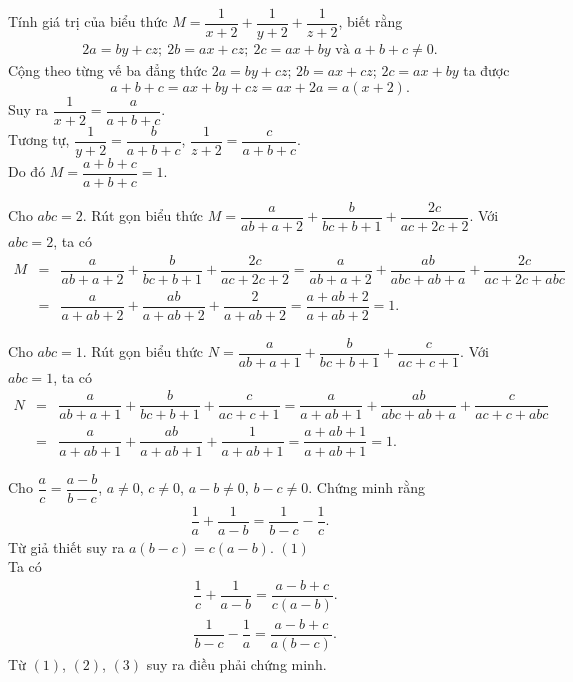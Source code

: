 \begin{bt}%
 Tính giá trị của biểu thức $M=\dfrac{1}{x+2} + \dfrac{1}{y+2} + \dfrac{1}{z+2}$, biết rằng
 \begin{eqnarray*}
  2a=by+cz;\ 2b=ax+cz;\ 2c=ax+by \text{ và } a+b+c \neq 0.
 \end{eqnarray*}
 \loigiai
  {
  Cộng theo từng vế ba đẳng thức $2a=by+cz$; $2b=ax+cz$; $2c=ax+by$ ta được
  \[a+b+c=ax+by+cz=ax+2a = a(x+2).\]
  Suy ra $\dfrac{1}{x+2}=\dfrac{a}{a+b+c}$.\\
  Tương tự, $\dfrac{1}{y+2}=\dfrac{b}{a+b+c}$, $\dfrac{1}{z+2}=\dfrac{c}{a+b+c}$.\\
  Do đó $M=\dfrac{a+b+c}{a+b+c}=1$.
  }
\end{bt}

\begin{bt}%
 Cho $abc=2$. Rút gọn biểu thức $M = \dfrac{a}{ab+a+2} + \dfrac{b}{bc+b+1} + \dfrac{2c}{ac+2c+2}$.
 \loigiai
  {
  Với $abc=2$, ta có
  \allowdisplaybreaks
  \begin{eqnarray*}
   M &=& \dfrac{a}{ab+a+2} + \dfrac{b}{bc+b+1} + \dfrac{2c}{ac+2c+2} = \dfrac{a}{ab+a+2} + \dfrac{ab}{abc+ab+a} + \dfrac{2c}{ac+2c+abc}\\
   &=& \dfrac{a}{a+ab+2}+\dfrac{ab}{a+ab+2}+\dfrac{2}{a+ab+2} = \dfrac{a+ab+2}{a+ab+2}=1.
  \end{eqnarray*}
  }
\end{bt}

\begin{bt}%
 Cho $abc=1$. Rút gọn biểu thức $N = \dfrac{a}{ab+a+1} + \dfrac{b}{bc+b+1} + \dfrac{c}{ac+c+1}$.
 \loigiai
  {
  Với $abc=1$, ta có
  \allowdisplaybreaks
  \begin{eqnarray*}
   N &=& \dfrac{a}{ab+a+1} + \dfrac{b}{bc+b+1} + \dfrac{c}{ac+c+1} = \dfrac{a}{a+ab+1} + \dfrac{ab}{abc+ab+a} + \dfrac{c}{ac+c+abc}\\
   &=& \dfrac{a}{a+ab+1} + \dfrac{ab}{a+ab+1} + \dfrac{1}{a+ab+1} = \dfrac{a+ab+1}{a+ab+1}=1.
  \end{eqnarray*}
  }
\end{bt}

\begin{bt}%
 Cho $\dfrac{a}{c}=\dfrac{a-b}{b-c}$, $a\neq 0$, $c\neq 0$, $a-b\neq 0$, $b-c\neq 0$. Chứng minh rằng
 \begin{eqnarray*}
  \dfrac{1}{a} + \dfrac{1}{a-b} = \dfrac{1}{b-c} - \dfrac{1}{c}.
 \end{eqnarray*}
 \loigiai
  {
  Từ giả thiết suy ra $a(b-c)=c(a-b)$. \hfill $(1)$\\
  Ta có
  \allowdisplaybreaks
  \begin{align}
   & \dfrac{1}{c}+\dfrac{1}{a-b} = \dfrac{a-b+c}{c(a-b)}. \tag{2}\\
   & \dfrac{1}{b-c}-\dfrac{1}{a} = \dfrac{a-b+c}{a(b-c)}. \tag{3}
  \end{align}
  Từ $(1)$, $(2)$, $(3)$ suy ra điều phải chứng minh.
  }
\end{bt}

